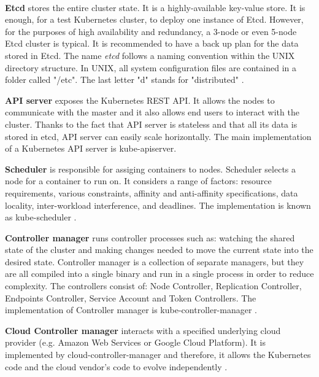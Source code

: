 \paragraph{}
\textbf{Etcd} stores the entire cluster state. It is a highly-available key-value store. It is enough, for a test Kubernetes cluster, to deploy one instance of Etcd. However, for the purposes of high availability and redundancy, a 3-node or even 5-node Etcd cluster is typical. It is recommended to have a back up plan for the data stored in Etcd\cite{book-mastering-k8s,k8s-components}. The name \textit{etcd} follows a naming convention within the UNIX directory structure. In UNIX, all system configuration files are contained in a folder called "/etc". The last letter "d" stands for "distributed" \cite{etcd-name}.

\textbf{API server} exposes the Kubernetes REST API. It allows the nodes to communicate with the master and it also allows end users to interact with the cluster. Thanks to the fact that API server is stateless and that all its data is stored in etcd, API server can easily scale horizontally. The main implementation of a Kubernetes API server is kube-apiserver\cite{book-mastering-k8s,k8s-components,k8s-cluster}.


\textbf{Scheduler} is responsible for assiging containers to nodes. Scheduler selects a node for a container to run on. It considers a range of factors: resource requirements, various constraints, affinity and anti-affinity specifications, data locality, inter-workload interference, and deadlines. The implementation is known as kube-scheduler \cite{book-mastering-k8s, k8s-components}.

\textbf{Controller manager} runs controller processes such as: watching the shared state of the cluster and making changes needed to move the current state into the desired state. Controller manager is a collection of separate managers, but they are all compiled into a single binary and run in a single process in order to reduce complexity. The controllers consist of: Node Controller, Replication Controller, Endpoints Controller, Service Account and Token Controllers. The implementation of Controller manager is kube-controller-manager \cite{book-mastering-k8s, k8s-components}.

\textbf{Cloud Controller manager} interacts with a specified underlying cloud provider (e.g. Amazon Web Services or Google Cloud Platform). It is implemented by cloud-controller-manager and therefore, it allows the Kubernetes code and the cloud vendor’s code to evolve independently \cite{k8s-components}.

